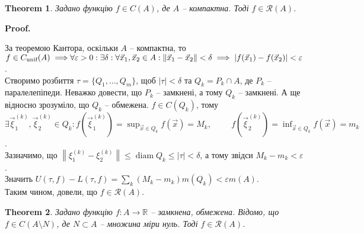 \documentclass[a4paper, 10pt]{article}
\makeatletter
\DeclareMathOperator*\diam{diam}
\def\huge{\displaystyle}
\def\qed{$\blacksquare$}
\theoremstyle{theoremdd}
\newtheorem{theorem}{Theorem}[subsection]
\theoremstyle{theoremdd}
\theoremstyle{theoremdd}
\theoremstyle{theoremdd}
\theoremstyle{theoremdd}
\theoremstyle{theoremdd}
\theoremstyle{theoremdd}
\theoremstyle{theoremdd}
\theoremstyle{theoremdd}
\theoremstyle{theoremdd}
\theoremstyle{theoremdd}
\theoremstyle{theoremdd}
\theoremstyle{theoremdd}
\theoremstyle{theoremdd}
\theoremstyle{theoremdd}
\renewenvironment{proof}[1][Proof.\\]{\par
\pushQED{\hfill \qed}%
\normalfont \topsep6\p@\@plus6\p@\relax
\trivlist
\item\relax
{\bfseries
#1\@addpunct{.}}\hspace\labelsep\ignorespaces
}{%
\popQED\endtrivlist\@endpefalse
}
\newcommand\Norm[1]{\left\lVert#1\right\rVert}
\makeatother
\begin{document}
\begin{theorem}
Задано функцію $f \in C(A)$, де $A$ -- компактна. Тоді $f \in \mathcal{R}(A)$.
\end{theorem}

\begin{proof}
За теоремою Кантора, оскільки $A$ -- компактна, то $f \in C_{\text{unif}}(A) \implies \\ \forall \varepsilon > 0: \exists \delta: \forall \vec{x}_1,\vec{x}_2 \in A: \Norm{\vec{x}_1-\vec{x}_2}<\delta \implies |f(\vec{x}_1)-f(\vec{x}_2)| < \varepsilon$.\\
Створимо розбиття $\tau = \{Q_1,\dots,Q_m\}$, щоб $|\tau| < \delta$ та $Q_k = P_k \cap A$, де $P_k$ -- паралелепіпеди. Неважко довести, що $P_k$ -- замкнені, а тому $Q_k$ -- замкнені. А ще відносно зрозуміло, що $Q_k$ -- обмежена. $f \in C(Q_k)$, тому \\
$\exists \vec{\xi}_1^{(k)},\vec{\xi}_2^{(k)} \in Q_k: f(\vec{\xi}_1^{(k)}) = \huge\sup_{\vec{x} \in Q_k} f(\vec{x}) = M_k, \hspace{1cm} f(\vec{\xi}_2^{(k)}) = \huge\inf_{\vec{x} \in Q_k} f(\vec{x}) = m_k$.\\
Зазначимо, що $\Norm{\xi_1^{(k)} - \xi_2^{(k)}} \leq \diam Q_k \leq |\tau| < \delta$, а тому звідси $M_k - m_k < \varepsilon$.\\
Значить $U(\tau,f) - L(\tau,f) = \huge\sum_k (M_k-m_k)m(Q_k) < \varepsilon m(A)$.\\
Таким чином, довели, що $f \in \mathcal{R}(A)$.
\end{proof}

\begin{theorem}
Задано функцію $f \colon A \to \mathbb{R}$ -- замкнена, обмежена. Відомо, що $f \in C(A \setminus N)$, де $N \subset A$ -- множина міри нуль. Тоді $f \in \mathcal{R}(A)$.
\end{theorem}
\end{document}
